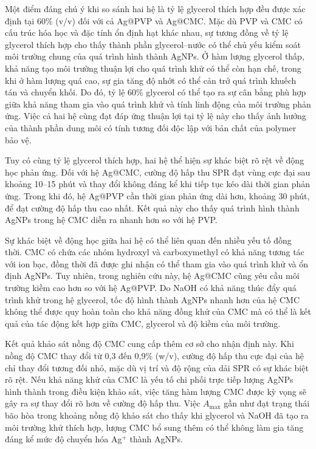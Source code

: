 Một điểm đáng chú ý khi so sánh hai hệ là tỷ lệ glycerol thích hợp đều được xác định tại 60\% (v/v) đối với cả Ag@PVP và Ag@CMC. 
Mặc dù PVP và CMC có cấu trúc hóa học và đặc tính ổn định hạt khác nhau, sự tương đồng về tỷ lệ glycerol thích hợp cho thấy thành phần glycerol–nước có thể chủ yếu kiểm soát môi trường chung của quá trình hình thành AgNPs. 
Ở hàm lượng glycerol thấp, khả năng tạo môi trường thuận lợi cho quá trình khử có thể còn hạn chế, trong khi ở hàm lượng quá cao, sự gia tăng độ nhớt có thể cản trở quá trình khuếch tán và chuyển khối. 
Do đó, tỷ lệ 60\% glycerol có thể tạo ra sự cân bằng phù hợp giữa khả năng tham gia vào quá trình khử và tính linh động của môi trường phản ứng. 
Việc cả hai hệ cùng đạt đáp ứng thuận lợi tại tỷ lệ này cho thấy ảnh hưởng của thành phần dung môi có tính tương đối độc lập với bản chất của polymer bảo vệ.

Tuy có cùng tỷ lệ glycerol thích hợp, hai hệ thể hiện sự khác biệt rõ rệt về động học phản ứng.
Đối với hệ Ag@CMC, cường độ hấp thu SPR đạt vùng cực đại sau khoảng 10–15 phút và thay đổi không đáng kể khi tiếp tục kéo dài thời gian phản ứng. 
Trong khi đó, hệ Ag@PVP cần thời gian phản ứng dài hơn, khoảng 30 phút, để đạt cường độ hấp thu cao nhất. 
Kết quả này cho thấy quá trình hình thành AgNPs trong hệ CMC diễn ra nhanh hơn so với hệ PVP.

Sự khác biệt về động học giữa hai hệ có thể liên quan đến nhiều yếu tố đồng thời. 
CMC có chứa các nhóm hydroxyl và carboxymethyl có khả năng tương tác với ion bạc, đồng thời đã được ghi nhận có thể tham gia vào quá trình khử và ổn định AgNPs. 
Tuy nhiên, trong nghiên cứu này, hệ Ag@CMC cũng yêu cầu môi trường kiềm cao hơn so với hệ Ag@PVP. 
Do NaOH có khả năng thúc đẩy quá trình khử trong hệ glycerol, tốc độ hình thành AgNPs nhanh hơn của hệ CMC không thể được quy hoàn toàn cho khả năng đồng khử của CMC mà có thể là kết quả của tác động kết hợp giữa CMC, glycerol và độ kiềm của môi trường.

Kết quả khảo sát nồng độ CMC cung cấp thêm cơ sở cho nhận định này. 
Khi nồng độ CMC thay đổi từ 0,3 đến 0,9\% (w/v), cường độ hấp thu cực đại của hệ chỉ thay đổi tương đối nhỏ, mặc dù vị trí và độ rộng của dải SPR có sự khác biệt rõ rệt. 
Nếu khả năng khử của CMC là yếu tố chi phối trực tiếp lượng AgNPs hình thành trong điều kiện khảo sát, việc tăng hàm lượng CMC được kỳ vọng sẽ gây ra sự thay đổi rõ hơn về cường độ hấp thu. 
Việc $A_{\max}$ gần như đạt trạng thái bão hòa trong khoảng nồng độ khảo sát cho thấy khi glycerol và NaOH đã tạo ra môi trường khử thích hợp, lượng CMC bổ sung thêm có thể không làm gia tăng đáng kể mức độ chuyển hóa Ag$^+$ thành AgNPs.

